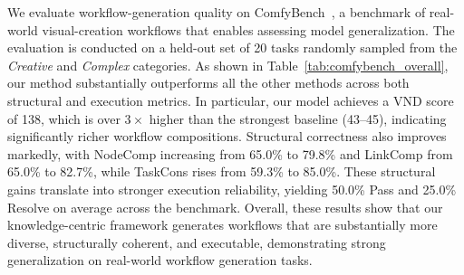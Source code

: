 \documentclass[runningheads]{llncs}
\begin{document}
We evaluate workflow-generation quality on ComfyBench~\cite{xue2025comfybench}, a benchmark of real-world visual-creation workflows that enables assessing model generalization. 
The evaluation is conducted on a held-out set of 20 tasks randomly sampled from the \emph{Creative} and \emph{Complex} categories. 
As shown in Table~\ref{tab:comfybench_overall}, our method substantially outperforms all the other methods across both structural and execution metrics. 
In particular, our model achieves a VND score of 138, which is over $3\times$ higher than the strongest baseline (43–45), indicating significantly richer workflow compositions. 
Structural correctness also improves markedly, with NodeComp increasing from 65.0\% to 79.8\% and LinkComp from 65.0\% to 82.7\%, while TaskCons rises from 59.3\% to 85.0\%. 
These structural gains translate into stronger execution reliability, yielding 50.0\% Pass and 25.0\% Resolve on average across the benchmark. 
Overall, these results show that our knowledge-centric framework generates workflows that are substantially more diverse, structurally coherent, and executable, demonstrating strong generalization on real-world workflow generation tasks.

\begin{table}[t]
\centering
\caption{Overall workflow generation performance on ComfyBench.
Workflow structure metrics include VND (Valid Node Diversity),
NodeComp (Node Completeness), LinkComp (Link Completeness),
and TaskCons (Task Consistency).
Execution metrics report the average Pass and Resolve rates.}
\label{tab:comfybench_overall}
\end{table}
\end{document}
